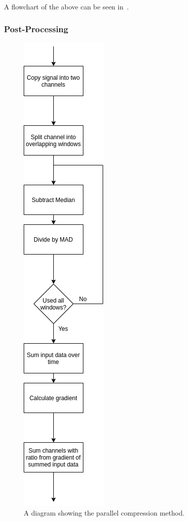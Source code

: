                     A flowchart of the above can be seen in~.
                
                \subsubsection{Post-Processing} \label{sec:pca_data_driven_surrogate_signal_extraction_methods_for_dynamic_pet_methods_post_processing}
                    \begin{figure}
                        \centering
                        
                        \includegraphics[width=0.2\linewidth]{figures/pca_data_driven_surrogate_signal_extraction_methods_for_dynamic_pet_methods_data_driven_surrogate_signal_extraction_parallel.png}
                        
                        \captionsetup{singlelinecheck=false, justification=centering}
                        \caption{A diagram showing the parallel compression method.}
                        \label{fig:pca_data_driven_surrogate_signal_extraction_methods_for_dynamic_pet_methods_data_driven_surrogate_signal_extraction_parallel}
                    \end{figure}
                    
